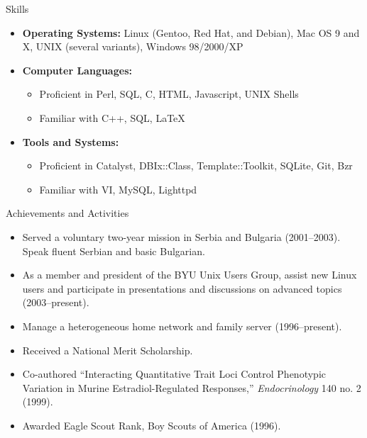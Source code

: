 \documentclass[11pt,oneside]{article}
\newenvironment{ressection}[1]{
	\vspace{4pt}
	{\fontfamily{phv}\selectfont\Large#1}
	\begin{itemize}
	\vspace{3pt}
}{
	\end{itemize}
}
\newcommand{\resitem}[1]{
	\vspace{-4pt}
	\item \begin{flushleft} #1 \end{flushleft}
}
\newcommand{\ressubitem}[1]{
	\vspace{-1pt}
	\item \begin{flushleft} #1 \end{flushleft}
}
\newenvironment{reslist}[1]{
	\resitem{\textbf{#1}}
	\vspace{-5pt}
	\begin{itemize}
}{
	\end{itemize}
}
\begin{document}
\begin{ressection}{Skills}

	\resitem{\textbf{Operating Systems:} Linux (Gentoo, Red Hat, and Debian), Mac OS 9 and X, UNIX (several variants), Windows 98/2000/XP}

	\begin{reslist}{Computer Languages:}

		\ressubitem{Proficient in Perl, SQL, C, HTML, Javascript, UNIX Shells}

		\ressubitem{Familiar with C++, SQL, \LaTeX}

	\end{reslist}

	\begin{reslist}{Tools and Systems:}

		\ressubitem{Proficient in Catalyst, DBIx::Class, Template::Toolkit, SQLite, Git, Bzr}

		\ressubitem{Familiar with VI, MySQL, Lighttpd}

	\end{reslist}


\end{ressection}


\begin{ressection}{Achievements and Activities}

	\resitem{Served a voluntary two-year mission in Serbia and Bulgaria (2001--2003).  Speak fluent Serbian and basic Bulgarian.}

	\resitem{As a member and president of the BYU Unix Users Group, assist new Linux users and participate in presentations and discussions on advanced topics (2003--present).}

	\resitem{Manage a heterogeneous home network and family server (1996--present).}

	\resitem{Received a National Merit Scholarship.}

	\resitem{Co-authored ``Interacting Quantitative Trait Loci Control Phenotypic Variation in Murine Estradiol-Regulated Responses,'' \textit{Endocrinology} 140 no. 2 (1999).}

	\resitem{Awarded Eagle Scout Rank, Boy Scouts of America (1996).}


\end{ressection}
\end{document}
